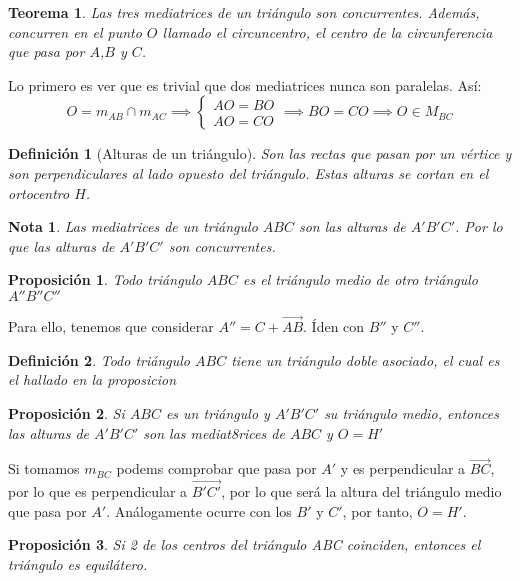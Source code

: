 \documentclass[11pt, a4paper, titlepage]{article}
\makeatletter
\renewenvironment{proof}[1][\proofname] {\vspace{-15pt}\par\pushQED{\qed}\normalfont\topsep6\p@\@plus6\p@\relax\trivlist\item[\hskip\labelsep\it#1\@addpunct{.}]\ignorespaces}{\popQED\endtrivlist\@endpefalse}
\renewcommand{\vec}{\overrightarrow}
\theoremstyle{theorem-style}
\newtheorem*{nth}{Teorema}
\newtheorem*{nprop}{Proposición}
\theoremstyle{definition-style}
\newtheorem*{ndef}{Definición}
\theoremstyle{remark-style}
\newtheorem*{nota}{Nota}
\theoremstyle{example-style}
\makeatother
\begin{document}
\begin{nth}
  Las tres mediatrices de un triángulo son concurrentes. Además, concurren en el punto $O$ llamado el circuncentro, el centro de la circunferencia que pasa por $A$,$B$ y $C$.
\end{nth}
\begin{proof}
  Lo primero es ver que es trivial que dos mediatrices nunca son paralelas. Así:
  \[
    O = m_{AB} \cap m_{AC}\implies \begin{cases}
      AO = BO\\
      AO = CO
    \end{cases} \implies BO = CO \implies O \in M_{BC}
  \]
\end{proof}


\begin{ndef}[Alturas de un triángulo]
  Son las rectas que pasan por un vértice y son perpendiculares al lado opuesto del triángulo. Estas alturas se cortan en el ortocentro $H$.
\end{ndef}

\begin{nota}
  Las mediatrices de un triángulo $ABC$ son las alturas de $A'B'C'$. Por lo que las alturas de $A'B'C'$ son concurrentes.
\end{nota}

\begin{nprop}
  Todo triángulo $ABC$ es el triángulo medio de otro triángulo $A''B''C''$
\end{nprop}
\begin{proof}
  Para ello, tenemos que considerar $A'' = C+ \vec{AB}$. Íden con $B''$ y $C''$.
\end{proof}
\begin{ndef}
  Todo triángulo $ABC$ tiene un triángulo doble asociado, el cual es el hallado en la proposicion 
\end{ndef}


\begin{nprop}
  Si $ABC$ es un triángulo y $A'B'C'$ su triángulo medio, entonces las alturas de $A'B'C'$ son las mediat8rices de $ABC$ y $O=H'$
\end{nprop}
\begin{proof}
  Si tomamos $m_{BC}$ podems comprobar que pasa por $A'$ y es perpendicular a $\vec{BC}$, por lo que es perpendicular a $\vec{B'C'}$, por lo que será la altura del triángulo medio que pasa por $A'$. Análogamente ocurre con los $B'$ y $C'$, por tanto, $O=H'$.
\end{proof}
\begin{nprop}Si 2 de los centros del triángulo ABC coinciden, entonces el triángulo es equilátero.
\end{nprop}
\end{document}
